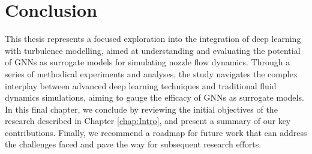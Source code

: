 \chapter{Conclusion}
\label{chap:Conclusion}
This thesis represents a focused exploration into the integration of deep learning with turbulence modelling, aimed at understanding and evaluating the potential of GNNs as surrogate models for simulating nozzle flow dynamics. Through a series of methodical experiments and analyses, the study navigates the complex interplay between advanced deep learning techniques and traditional fluid dynamics simulations, aiming to gauge the efficacy of GNNs as surrogate models. In this final chapter, we conclude by reviewing the initial objectives of the research described in Chapter \ref{chap:Intro}, and present a summary of our key contributions. Finally, we recommend a roadmap for future work that can address the challenges faced and pave the way for subsequent research efforts. 







